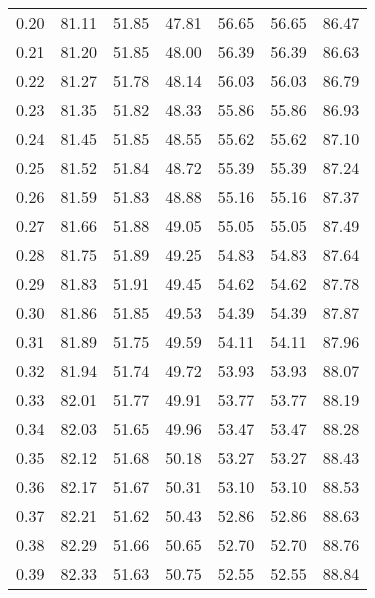 \begin{tabular}{|c|c|c|c|c|c|c|}
      0.20 &     81.11 &     51.85 &      47.81 &   56.65 &      56.65 &         86.47 \\
      0.21 &     81.20 &     51.85 &      48.00 &   56.39 &      56.39 &         86.63 \\
      0.22 &     81.27 &     51.78 &      48.14 &   56.03 &      56.03 &         86.79 \\
      0.23 &     81.35 &     51.82 &      48.33 &   55.86 &      55.86 &         86.93 \\
      0.24 &     81.45 &     51.85 &      48.55 &   55.62 &      55.62 &         87.10 \\
      0.25 &     81.52 &     51.84 &      48.72 &   55.39 &      55.39 &         87.24 \\
      0.26 &     81.59 &     51.83 &      48.88 &   55.16 &      55.16 &         87.37 \\
      0.27 &     81.66 &     51.88 &      49.05 &   55.05 &      55.05 &         87.49 \\
      0.28 &     81.75 &     51.89 &      49.25 &   54.83 &      54.83 &         87.64 \\
      0.29 &     81.83 &     51.91 &      49.45 &   54.62 &      54.62 &         87.78 \\
      0.30 &     81.86 &     51.85 &      49.53 &   54.39 &      54.39 &         87.87 \\
      0.31 &     81.89 &     51.75 &      49.59 &   54.11 &      54.11 &         87.96 \\
      0.32 &     81.94 &     51.74 &      49.72 &   53.93 &      53.93 &         88.07 \\
      0.33 &     82.01 &     51.77 &      49.91 &   53.77 &      53.77 &         88.19 \\
      0.34 &     82.03 &     51.65 &      49.96 &   53.47 &      53.47 &         88.28 \\
      0.35 &     82.12 &     51.68 &      50.18 &   53.27 &      53.27 &         88.43 \\
      0.36 &     82.17 &     51.67 &      50.31 &   53.10 &      53.10 &         88.53 \\
      0.37 &     82.21 &     51.62 &      50.43 &   52.86 &      52.86 &         88.63 \\
      0.38 &     82.29 &     51.66 &      50.65 &   52.70 &      52.70 &         88.76 \\
      0.39 &     82.33 &     51.63 &      50.75 &   52.55 &      52.55 &         88.84 \\

\end{tabular}
